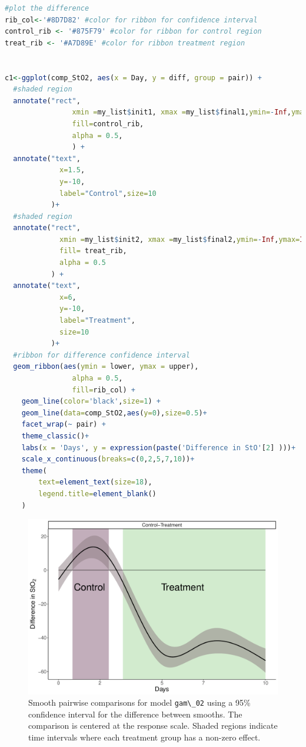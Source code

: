 \documentclass[
]{article}
\newcommand{\passthrough}[1]{#1}
\begin{document}
\begin{lstlisting}[language=R]
#plot the difference
rib_col<-'#8D7D82' #color for ribbon for confidence interval
control_rib <- '#875F79' #color for ribbon for control region
treat_rib <- '#A7D89E' #color for ribbon treatment region
  
  
c1<-ggplot(comp_StO2, aes(x = Day, y = diff, group = pair)) +
  #shaded region
  annotate("rect",
                xmin =my_list$init1, xmax =my_list$final1,ymin=-Inf,ymax=Inf,
                fill=control_rib,
                alpha = 0.5,
                ) +
  annotate("text",
             x=1.5,
             y=-10,
             label="Control",size=10
           )+
  #shaded region  
  annotate("rect",
             xmin =my_list$init2, xmax =my_list$final2,ymin=-Inf,ymax=Inf,
             fill= treat_rib,
             alpha = 0.5
           ) +
  annotate("text",
             x=6,
             y=-10,
             label="Treatment",
             size=10
           )+
  #ribbon for difference confidence interval  
  geom_ribbon(aes(ymin = lower, ymax = upper),
                alpha = 0.5,
                fill=rib_col) +
    geom_line(color='black',size=1) +
    geom_line(data=comp_StO2,aes(y=0),size=0.5)+
    facet_wrap(~ pair) +
    theme_classic()+
    labs(x = 'Days', y = expression(paste('Difference in StO'[2] )))+
    scale_x_continuous(breaks=c(0,2,5,7,10))+
    theme(
        text=element_text(size=18),
        legend.title=element_blank()
    )
\end{lstlisting}



\begin{figure}

{\centering \includegraphics[width=0.75\linewidth]{SIM_Appendix_files/figure-latex/pairwise-comp-workflow-fig-1} 

}

\caption{Smooth pairwise comparisons for model \passthrough{\lstinline!gam\_02!} using a 95\% confidence interval for the difference between smooths. The comparison is centered at the response scale. Shaded regions indicate time intervals where each treatment group has a non-zero effect.}\label{fig:pairwise-comp-workflow-fig}
\end{figure}
\end{document}
